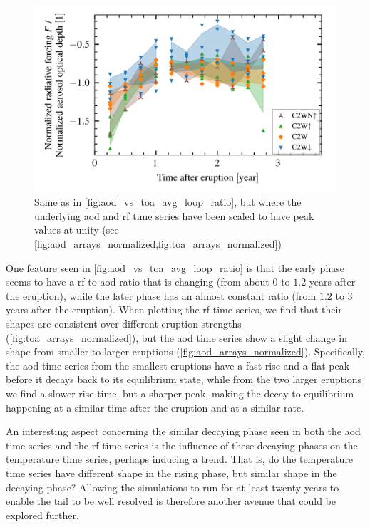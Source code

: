 \documentclass{ametsocV5}
\begin{document}
\begin{figure}[t]
  \begin{center}
    \includegraphics[width=0.95\linewidth]{figures/aod_vs_toa_avg_loop_ratio_scaled.png}
  \end{center}
  \caption{ Same as in \cref{fig:aod_vs_toa_avg_loop_ratio}, but where the underlying
    \ac{aod} and \ac{rf} time series  have been scaled to have peak values at unity (see
    \cref{fig:aod_arrays_normalized,fig:toa_arrays_normalized})}%
  \label{fig:aod_vs_toa_avg_loop_ratio_scaled}
\end{figure}

One feature seen in \cref{fig:aod_vs_toa_avg_loop_ratio} is that the early phase seems
to have a \ac{rf} to \ac{aod} ratio that is changing (from about \(0\) to \(1.2\) years
after the eruption), while the later phase has an almost constant ratio (from \(1.2\) to
\(3\) years after the eruption). When plotting the \ac{rf} time series, we find that
their shapes are consistent over different eruption strengths
(\cref{fig:toa_arrays_normalized}), but the \ac{aod} time series show a slight change in
shape from smaller to larger eruptions (\cref{fig:aod_arrays_normalized}). Specifically,
the \ac{aod} time series from the smallest eruptions have a fast rise and a flat peak
before it decays back to its equilibrium state, while from the two larger eruptions we
find a slower rise time, but a sharper peak, making the decay to equilibrium happening
at a similar time after the eruption and at a similar rate.

An interesting aspect concerning the similar decaying phase seen in both the \ac{aod}
time series and the \ac{rf} time series is the influence of these decaying phases on the
temperature time series, perhaps inducing a trend. That is, do the temperature time
series have different shape in the rising phase, but similar shape in the decaying
phase? Allowing the simulations to run for at least twenty years to enable the tail to
be well resolved is therefore another avenue that could be explored further.
\end{document}
